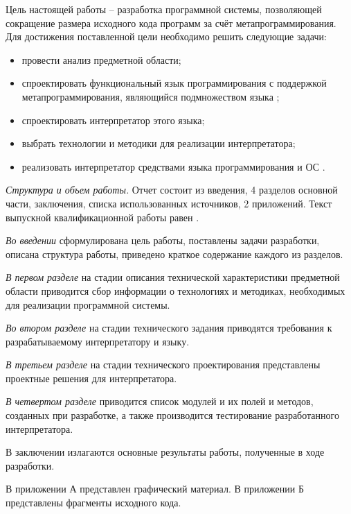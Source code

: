 Цель настоящей работы – разработка программной системы, позволяющей сокращение размера исходного кода программ за счёт метапрограммирования. Для достижения поставленной цели необходимо решить следующие задачи:
\begin{itemize}
	\item провести анализ предметной области;
	\item спроектировать функциональный язык программирования с поддержкой метапрограммирования, являющийся подмножеством языка ;
	\item спроектировать интерпретатор этого языка;
	\item выбрать технологии и методики для реализации интерпретатора;
	\item реализовать интерпретатор средствами языка программирования  и ОС .
\end{itemize}

\emph{Структура и объем работы.} Отчет состоит из введения, 4 разделов основной части, заключения, списка использованных источников, 2 приложений. Текст выпускной квалификационной работы равен .

\emph{Во введении} сформулирована цель работы, поставлены задачи разработки, описана структура работы, приведено краткое содержание каждого из разделов.

\emph{В первом разделе} на стадии описания технической характеристики предметной области приводится сбор информации о технологиях и методиках, необходимых для реализации программной системы.

\emph{Во втором разделе} на стадии технического задания приводятся требования к разрабатываемому интерпретатору и языку.

\emph{В третьем разделе} на стадии технического проектирования представлены проектные решения для интерпретатора.

\emph{В четвертом разделе} приводится список модулей и их полей и методов, созданных при разработке, а также производится тестирование разработанного интерпретатора.

В заключении излагаются основные результаты работы, полученные в ходе разработки.

В приложении А представлен графический материал.
В приложении Б представлены фрагменты исходного кода. 
